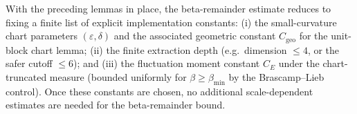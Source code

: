 With the preceding lemmas in place, the beta-remainder estimate reduces to fixing a finite list of explicit implementation constants:
(i) the small-curvature chart parameters $(\varepsilon,\delta)$ and the associated geometric constant $C_{\mathrm{geo}}$ for the unit-block chart lemma;
(ii) the finite extraction depth (e.g.\ dimension $\le 4$, or the safer cutoff $\le 6$);
and (iii) the fluctuation moment constant $C_E$ under the chart-truncated measure (bounded uniformly for $\beta\ge\beta_{\min}$ by the Brascamp--Lieb control).
Once these constants are chosen, no additional scale-dependent estimates are needed for the beta-remainder bound.

